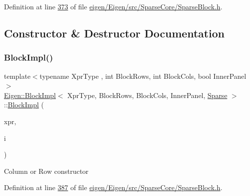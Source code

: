 Definition at line \hyperlink{eigen_2_eigen_2src_2_sparse_core_2_sparse_block_8h_source_l00373}{373} of file \hyperlink{eigen_2_eigen_2src_2_sparse_core_2_sparse_block_8h_source}{eigen/\+Eigen/src/\+Sparse\+Core/\+Sparse\+Block.\+h}.



\subsection{Constructor \& Destructor Documentation}
\mbox{\label{class_eigen_1_1_block_impl_3_01_xpr_type_00_01_block_rows_00_01_block_cols_00_01_inner_panel_00_01_sparse_01_4_aa724feeda73e4d5d2330c6dced2d18f9}} 
\subsubsection{\texorpdfstring{Block\+Impl()}{BlockImpl()}\hspace{0.1cm}{\footnotesize\ttfamily [1/4]}}
{\footnotesize\ttfamily template$<$typename Xpr\+Type , int Block\+Rows, int Block\+Cols, bool Inner\+Panel$>$ \\
\hyperlink{class_eigen_1_1_block_impl}{Eigen\+::\+Block\+Impl}$<$ Xpr\+Type, Block\+Rows, Block\+Cols, Inner\+Panel, \hyperlink{struct_eigen_1_1_sparse}{Sparse} $>$\+::\hyperlink{class_eigen_1_1_block_impl}{Block\+Impl} (\begin{DoxyParamCaption}\item[{Xpr\+Type \&}]{xpr,  }\item[{\hyperlink{group___core___module_a554f30542cc2316add4b1ea0a492ff02}{Index}}]{i }\end{DoxyParamCaption})\hspace{0.3cm}{\ttfamily [inline]}}

Column or Row constructor 

Definition at line \hyperlink{eigen_2_eigen_2src_2_sparse_core_2_sparse_block_8h_source_l00387}{387} of file \hyperlink{eigen_2_eigen_2src_2_sparse_core_2_sparse_block_8h_source}{eigen/\+Eigen/src/\+Sparse\+Core/\+Sparse\+Block.\+h}.

